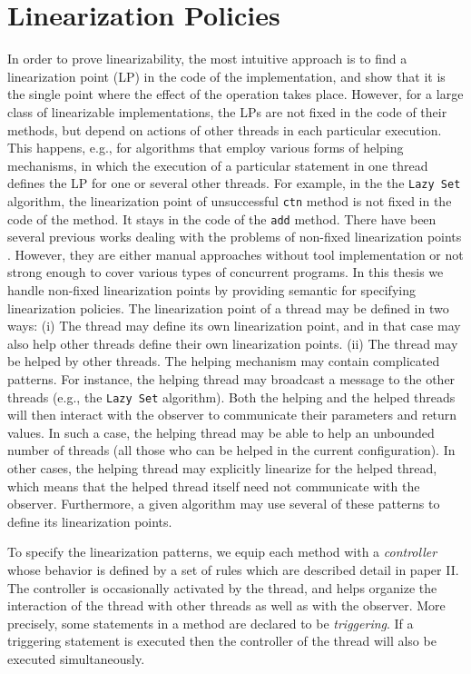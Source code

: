 \section*{Linearization Policies}
\label{controllers:subsection}
In order to prove linearizability, the most intuitive approach is to find a linearization point (LP) in the code of the implementation, and show that it is the single point where the effect of the operation takes place. However, for a large class of linearizable implementations,
the LPs are not fixed in the code of their methods, but depend on actions
of other threads in each particular execution. This happens, e.g., for algorithms that
employ various forms of helping mechanisms, in which the execution of a particular
statement in one thread defines the LP for one or several other threads. For example, in the the {\tt Lazy Set} algorithm, the linearization point of unsuccessful {\tt ctn} method is not fixed in the code of the method. It stays in the code of the {\tt add} method. There have been several previous works dealing with the problems of non-fixed linearization points \cite{Poling,Colvin:Lazy-List,CGLM:cav06,SWD:cav12,Derrick:fm14,SDW:tcl14,Vafeiadis:cav10,Vafeiadis:Aspect}. However, they are either manual approaches without tool implementation or not strong enough to cover various types of concurrent programs. In this thesis we handle non-fixed linearization points by providing semantic for specifying linearization policies. The linearization point of a thread may be defined in two ways:
(i) The thread may define its own linearization point,
and in that case may also help other threads define their 
own linearization points.
(ii) The thread may be helped by other threads.
%
The helping mechanism may contain complicated patterns.
%
For instance, the helping thread may broadcast a message to the other threads
(e.g., the {\tt Lazy Set} algorithm).
%
Both the helping and the helped threads will then interact with the observer to
communicate their parameters and return values.
%
In such a case, the helping thread may be able to help an unbounded number
of threads (all those who can be helped in the current configuration).
%
In other cases, 
the helping thread may explicitly 
linearize for the helped thread, which means that 
the helped thread itself need not communicate with the observer.
%
%
Furthermore, a given algorithm may use several of these patterns to 
define its linearization points.
%
 

To specify the linearization patterns, we equip each method with a
{\it controller} whose behavior is defined by a set of rules which are described detail in paper II.
%
The controller is occasionally activated by the thread,
and helps organize the interaction  
of the thread with other threads as well as with the observer.
%
More precisely, some 
statements in a  method are declared to be {\it triggering}. If a triggering statement is executed then 
the controller of the thread will also be executed simultaneously.  



